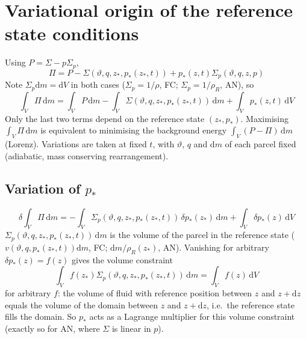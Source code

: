 \documentclass{article}
\begin{document}



\appendix
\section{Variational origin of the reference state conditions}
\label{app:variational}
Using \(P = \Sigma - p \Sigma_p\),
\begin{equation}
    \Pi
    =
    P
    - \Sigma(\vartheta, q, z_*, p_*(z_*, t))
    + p_*(z, t) \Sigma_p(\vartheta, q, z, p)
\end{equation}
Note \(\Sigma_p \mathrm{d}m = \mathrm{d}V\) in both cases (\(\Sigma_p = 1/\rho\), FC; \(\Sigma_p = 1/\rho_R\), AN), so
\begin{equation}
    \int_V \Pi \, \mathrm{d}m
    =
    \int_V P \, \mathrm{d}m
    - \int_V \Sigma(\vartheta, q, z_*, p_*(z_*, t)) \, \mathrm{d}m
    + \int_V p_*(z, t) \, \mathrm{d}V
\end{equation}
Only the last two terms depend on the reference state \((z_*, p_*)\).
Maximising \(\int_V \Pi \, \mathrm{d}m\) is equivalent to minimising the background energy \(\int_V (P - \Pi) \, \mathrm{d}m\) (Lorenz).
Variations are taken at fixed \(t\), with \(\vartheta\), \(q\) and \(\mathrm{d}m\) of each parcel fixed (adiabatic, mass conserving rearrangement).

\subsection{Variation of \texorpdfstring{\(p_*\)}{p*}}
\begin{equation}
    \delta \int_V \Pi \, \mathrm{d}m
    =
    - \int_V \Sigma_p(\vartheta, q, z_*, p_*(z_*, t)) \, \delta p_*(z_*) \, \mathrm{d}m
    + \int_V \delta p_*(z) \, \mathrm{d}V
\end{equation}
\(\Sigma_p(\vartheta, q, z_*, p_*(z_*, t)) \, \mathrm{d}m\) is the volume of the parcel in the reference state (\(v(\vartheta, q, p_*(z_*, t)) \mathrm{d}m\), FC; \(\mathrm{d}m / \rho_R(z_*)\), AN).
Vanishing for arbitrary \(\delta p_*(z) = f(z)\) gives the volume constraint
\begin{equation}
    \int_V f(z_*) \Sigma_p(\vartheta, q, z_*, p_*(z_*, t)) \, \mathrm{d}m
    =
    \int_V f(z) \, \mathrm{d}V
\end{equation}
for arbitrary \(f\): the volume of fluid with reference position between \(z\) and \(z + \mathrm{d}z\) equals the volume of the domain between \(z\) and \(z + \mathrm{d}z\), i.e.\ the reference state fills the domain.
So \(p_*\) acts as a Lagrange multiplier for this volume constraint (exactly so for AN, where \(\Sigma\) is linear in \(p\)).
\end{document}
